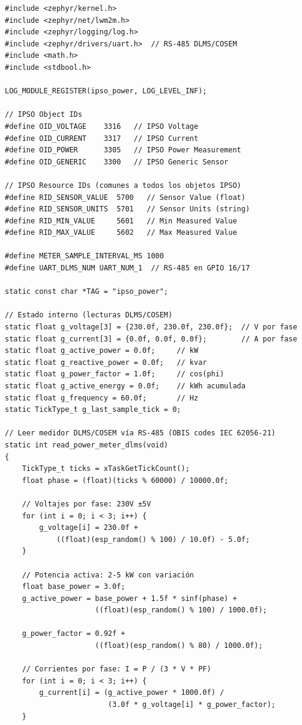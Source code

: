 \begin{verbatim}
#include <zephyr/kernel.h>
#include <zephyr/net/lwm2m.h>
#include <zephyr/logging/log.h>
#include <zephyr/drivers/uart.h>  // RS-485 DLMS/COSEM
#include <math.h>
#include <stdbool.h>

LOG_MODULE_REGISTER(ipso_power, LOG_LEVEL_INF);

// IPSO Object IDs
#define OID_VOLTAGE    3316   // IPSO Voltage
#define OID_CURRENT    3317   // IPSO Current
#define OID_POWER      3305   // IPSO Power Measurement
#define OID_GENERIC    3300   // IPSO Generic Sensor

// IPSO Resource IDs (comunes a todos los objetos IPSO)
#define RID_SENSOR_VALUE  5700   // Sensor Value (float)
#define RID_SENSOR_UNITS  5701   // Sensor Units (string)
#define RID_MIN_VALUE     5601   // Min Measured Value
#define RID_MAX_VALUE     5602   // Max Measured Value

#define METER_SAMPLE_INTERVAL_MS 1000
#define UART_DLMS_NUM UART_NUM_1  // RS-485 en GPIO 16/17

static const char *TAG = "ipso_power";

// Estado interno (lecturas DLMS/COSEM)
static float g_voltage[3] = {230.0f, 230.0f, 230.0f};  // V por fase
static float g_current[3] = {0.0f, 0.0f, 0.0f};        // A por fase
static float g_active_power = 0.0f;     // kW
static float g_reactive_power = 0.0f;   // kvar
static float g_power_factor = 1.0f;     // cos(phi)
static float g_active_energy = 0.0f;    // kWh acumulada
static float g_frequency = 60.0f;       // Hz
static TickType_t g_last_sample_tick = 0;

// Leer medidor DLMS/COSEM vía RS-485 (OBIS codes IEC 62056-21)
static int read_power_meter_dlms(void)
{
    TickType_t ticks = xTaskGetTickCount();
    float phase = (float)(ticks % 60000) / 10000.0f;

    // Voltajes por fase: 230V ±5V
    for (int i = 0; i < 3; i++) {
        g_voltage[i] = 230.0f +
            ((float)(esp_random() % 100) / 10.0f) - 5.0f;
    }

    // Potencia activa: 2-5 kW con variación
    float base_power = 3.0f;
    g_active_power = base_power + 1.5f * sinf(phase) +
                     ((float)(esp_random() % 100) / 1000.0f);

    g_power_factor = 0.92f +
                     ((float)(esp_random() % 80) / 1000.0f);

    // Corrientes por fase: I = P / (3 * V * PF)
    for (int i = 0; i < 3; i++) {
        g_current[i] = (g_active_power * 1000.0f) /
                        (3.0f * g_voltage[i] * g_power_factor);
    }


\end{verbatim}
